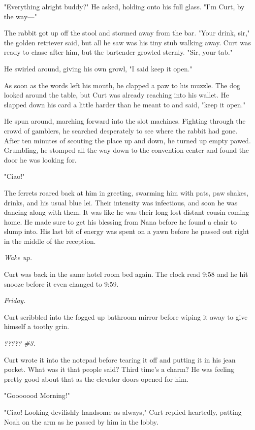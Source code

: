 "Everything alright buddy?" He asked, holding onto his full glass. "I'm Curt, by the way---"

The rabbit got up off the stool and stormed away from the bar. "Your drink, sir," the golden retriever said, but all he saw was his tiny stub walking away. Curt was ready to chase after him, but the bartender growled sternly. "Sir, your tab."

He swirled around, giving his own growl, "I said keep it open."

As soon as the words left his mouth, he clapped a paw to his muzzle. The dog looked around the table, but Curt was already reaching into his wallet. He slapped down his card a little harder than he meant to and said, "keep it open."

He spun around, marching forward into the slot machines. Fighting through the crowd of gamblers, he searched desperately to see where the rabbit had gone. After ten minutes of scouting the place up and down, he turned up empty pawed. Grumbling, he stomped all the way down to the convention center and found the door he was looking for.

"Ciao!"

The ferrets roared back at him in greeting, swarming him with pats, paw shakes, drinks, and his usual blue lei. Their intensity was infectious, and soon he was dancing along with them. It was like he was their long lost distant cousin coming home. He made sure to get his blessing from Nana before he found a chair to slump into. His last bit of energy was spent on a yawn before he passed out right in the middle of the reception.

\emph{Wake up.}

Curt was back in the same hotel room bed again. The clock read 9:58 and he hit snooze before it even changed to 9:59.

\emph{Friday.}

Curt scribbled into the fogged up bathroom mirror before wiping it away to give himself a toothy grin.

\emph{????? \#3.}

Curt wrote it into the notepad before tearing it off and putting it in his jean pocket. What was it that people said? Third time's a charm? He was feeling pretty good about that as the elevator doors opened for him.

"Gooooood Morning!"

"Ciao! Looking devilishly handsome as always," Curt replied heartedly, patting Noah on the arm as he passed by him in the lobby.

